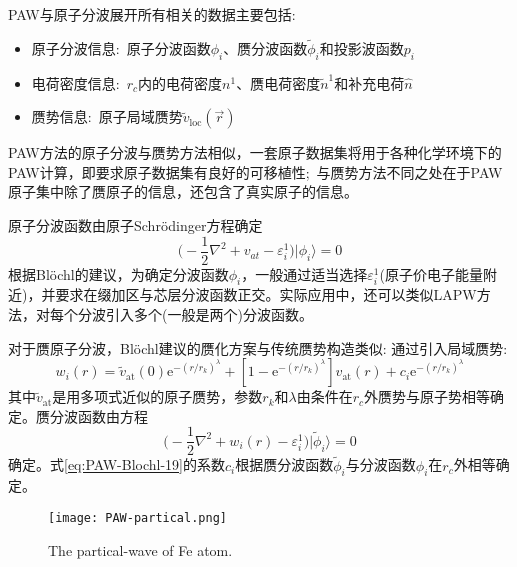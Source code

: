 \textrm{PAW}与原子分波展开所有相关的数据主要包括:~
	\begin{itemize}
		\item 原子分波信息:~原子分波函数$\phi_i$、赝分波函数$\tilde\phi_i$和投影波函数$p_i$
		\item 电荷密度信息:~$r_c$内的电荷密度$n^1$、赝电荷密度$\tilde n^1$和补充电荷$\hat n$
		\item 赝势信息:~原子局域赝势$\tilde v_{\mathrm{loc}}(\vec r)$
	\end{itemize}
\textrm{PAW}方法的原子分波与赝势方法相似，一套原子数据集将用于各种化学环境下的\textrm{PAW}计算，即要求原子数据集有良好的可移植性;~与赝势方法不同之处在于\textrm{PAW}原子集中除了赝原子的信息，还包含了真实原子的信息。

原子分波函数由原子\textrm{Schr\"odinger}方程确定
\begin{equation}
	\bigg(-\dfrac12\nabla^2+v_{at}-\varepsilon_i^1\bigg)|\phi_i\rangle=0
	\label{eq:PAW-Blochl-18}
\end{equation}
根据\textrm{Bl\"ochl}的建议，为确定分波函数$\phi_i$，一般通过适当选择$\varepsilon_i^1$(原子价电子能量附近)，并要求在缀加区与芯层分波函数正交。实际应用中，还可以类似\textrm{LAPW}方法，对每个分波引入多个(一般是两个)分波函数。

对于赝原子分波，\textrm{Bl\"ochl}建议的赝化方案与传统赝势构造类似:
通过引入局域赝势:%
\begin{equation}
	w_i(r)=\tilde v_{\mathrm{at}}(0)\mathrm{e}^{-(r/r_k)^{\lambda}}+[1-\mathrm{e}^{-(r/r_k)^{\lambda}}]v_{\mathrm{at}}(r)+c_i\mathrm{e}^{-(r/r_k)^{\lambda}}
	\label{eq:PAW-Blochl-19}
\end{equation}
其中$\tilde v_{\mathrm{at}}$是用多项式近似的原子赝势，参数$r_k$和$\lambda$由条件在$r_c$外赝势与原子势相等确定。赝分波函数由方程
\begin{equation}
	\bigg(-\dfrac12\nabla^2+w_i(r)-\varepsilon_i^1\bigg)|\tilde\phi_i\rangle=0
	\label{eq:PAW-Blochl-20}
\end{equation}
确定。式\eqref{eq:PAW-Blochl-19}的系数$c_i$根据赝分波函数$\tilde\phi_i$与分波函数$\phi_i$在$r_c$外相等确定。
\begin{figure}[h!]
\centering
\texttt{[image: PAW-partical.png]}
\caption{\small \textrm{The partical-wave of Fe atom.}}%
\label{PAW_partical_Fe}
\end{figure}

